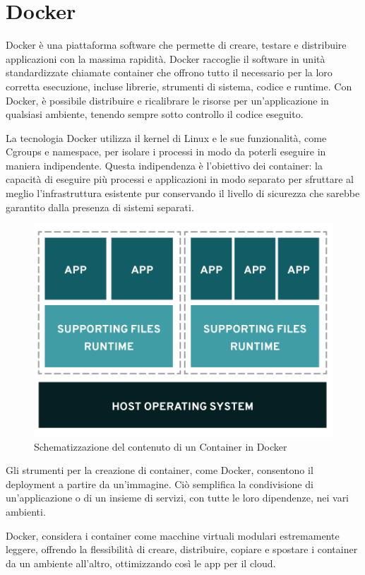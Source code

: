 \section{Docker}
Docker è una piattaforma software che permette di creare, testare e distribuire applicazioni con la massima rapidità. Docker raccoglie 
il software in unità standardizzate chiamate container che offrono tutto il necessario per la loro corretta esecuzione, incluse librerie, 
strumenti di sistema, codice e runtime. Con Docker, è possibile 
distribuire e ricalibrare le risorse per un'applicazione in qualsiasi ambiente, tenendo sempre sotto controllo il codice eseguito.

La tecnologia Docker utilizza il kernel di Linux e le sue funzionalità, come Cgroups e namespace, per isolare i processi in modo da poterli 
eseguire in maniera indipendente. Questa indipendenza è l'obiettivo dei container: la capacità di eseguire più processi e applicazioni in 
modo separato per sfruttare al meglio l'infrastruttura esistente pur conservando il livello di sicurezza che sarebbe garantito dalla 
presenza di sistemi separati.

\begin{figure}[ht!]
	\centering
	\includegraphics[scale=0.7]{images/Docker_Config_Container.png}
	\caption{Schematizzazione del contenuto di un Container in Docker}
	\label{fig:DCC}
\end{figure}

Gli strumenti per la creazione di container, come Docker, consentono il deployment a partire da un'immagine. Ciò semplifica la 
condivisione di un'applicazione o di un insieme di servizi, con tutte le loro dipendenze, nei vari ambienti.

Docker, considera i container come macchine virtuali modulari estremamente leggere, offrendo la flessibilità di creare, distribuire, 
copiare e spostare i container da un ambiente all'altro, ottimizzando così le app per il cloud.

